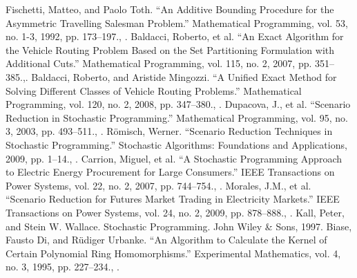 \documentclass{article}
\theoremstyle{plain}
\theoremstyle{definition}
\begin{document}
\begin{thebibliography}{99}
Fischetti, Matteo, and Paolo Toth. “An Additive Bounding Procedure for the Asymmetric Travelling Salesman Problem.” Mathematical Programming, vol. 53, no. 1-3, 1992, pp. 173–197., . 
Baldacci, Roberto, et al. “An Exact Algorithm for the Vehicle Routing Problem Based on the Set Partitioning Formulation with Additional Cuts.” Mathematical Programming, vol. 115, no. 2, 2007, pp. 351–385.,. 
Baldacci, Roberto, and Aristide Mingozzi. “A Unified Exact Method for Solving Different Classes of Vehicle Routing Problems.” Mathematical Programming, vol. 120, no. 2, 2008, pp. 347–380., . 
Dupacova, J., et al. “Scenario Reduction in Stochastic Programming.” Mathematical Programming, vol. 95, no. 3, 2003, pp. 493–511., . 
Römisch, Werner. “Scenario Reduction Techniques in Stochastic Programming.” Stochastic Algorithms: Foundations and Applications, 2009, pp. 1–14., . 
Carrion, Miguel, et al. “A Stochastic Programming Approach to Electric Energy Procurement for Large Consumers.” IEEE Transactions on Power Systems, vol. 22, no. 2, 2007, pp. 744–754., . 
Morales, J.M., et al. “Scenario Reduction for Futures Market Trading in Electricity Markets.” IEEE Transactions on Power Systems, vol. 24, no. 2, 2009, pp. 878–888., . 
 Kall, Peter, and Stein W. Wallace. Stochastic Programming. John Wiley & Sons, 1997. 
Biase, Fausto Di, and Rüdiger Urbanke. “An Algorithm to Calculate the Kernel of Certain Polynomial Ring Homomorphisms.” Experimental Mathematics, vol. 4, no. 3, 1995, pp. 227–234., .




\end{thebibliography}
\end{document}
